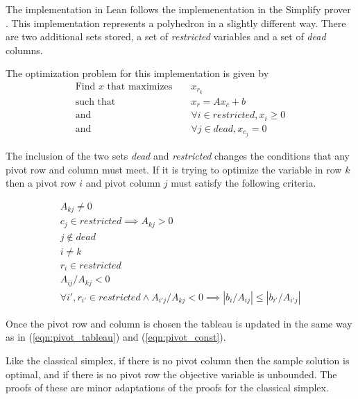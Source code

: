 \documentclass[11pt]{article} %
\begin{document}
The implementation in Lean follows the implemenentation in the Simplify prover \cite{simplify}. This implementation represents a polyhedron in a slightly different way. There are two additional sets stored, a set of \textit{restricted} variables and a set of \textit{dead} columns.

The optimization problem for this implementation is given by
\begin{equation}
  \begin{aligned}
  \text{Find } x \text{ that maximizes } && x_{r_k} \\
  \text{such that } && x_r = A x_c + b \\
  \text{and } && \forall i \in restricted, x_i \ge 0 \\
  \text{and } && \forall j \in dead, x_{c_j} = 0
  \end{aligned}
\end{equation}

The inclusion of the two sets \textit{dead} and \textit{restricted} changes the conditions that any pivot row and column must meet. If it is trying to optimize the variable in row $k$ then a pivot row $i$ and pivot column $j$ must satisfy the following criteria.

\begin{equation}
  \begin{aligned}
    A_{kj} \ne 0 \\
    c_j \in restricted \implies A_{kj} > 0 \\
    j \notin dead \\
    i \ne k \\
    r_i \in restricted \\
    A_{ij} / A_{kj} < 0 \\
    \forall i', r_{i'} \in restricted \wedge A_{i'j} / A_{kj} < 0 \implies \left|b_i/A_{ij}\right| \le \left|b_{i'} / A_{i'j}\right|
  \end{aligned}
\end{equation}

Once the pivot row and column is chosen the tableau is updated in the same way as in (\ref{eqn:pivot_tableau}) and (\ref{eqn:pivot_const}).

Like the classical simplex, if there is no pivot column then the sample solution is optimal, and if there is no pivot row the objective variable is unbounded. The proofs of these are minor adaptations of the proofs for the classical simplex.
\end{document}
